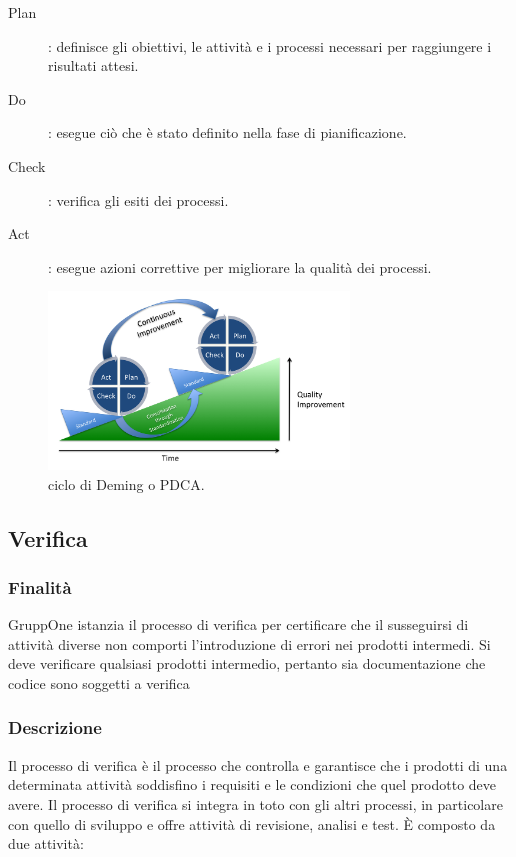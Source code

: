 \documentclass[../norme-di-progetto.tex]{subfiles}
\begin{document}
\begin{description}
  \item [Plan]: definisce gli obiettivi, le attività e i processi necessari per raggiungere i risultati attesi.
  \item [Do]: esegue ciò che è stato definito nella fase di pianificazione.
  \item [Check]: verifica gli esiti dei processi.
  \item [Act]: esegue azioni correttive per migliorare la qualità dei processi.
\end{description}
\begin{figure}[H]
  \includegraphics[width=8cm]{components/img/PDCA-process.png}
  \centering
  \caption{ciclo di Deming o PDCA.}
\end{figure}

\subsection{Verifica}%
\label{sub:verifica}

\subsubsection{Finalità}%
\label{subs:verifica/finalita}

GruppOne istanzia il processo di verifica per certificare che il susseguirsi di attività diverse non comporti l'introduzione di errori nei prodotti intermedi.
Si deve verificare qualsiasi prodotti intermedio, pertanto sia documentazione che codice sono soggetti a verifica

\subsubsection{Descrizione}%
\label{subs:verifica/descrizione}


Il processo di verifica è il processo che controlla e garantisce che i prodotti di una determinata attività soddisfino i requisiti e le condizioni che quel prodotto deve avere. Il processo di verifica si integra in toto con gli altri processi, in particolare con quello di sviluppo e offre attività di revisione, analisi e test. È composto da due attività:
\end{document}
